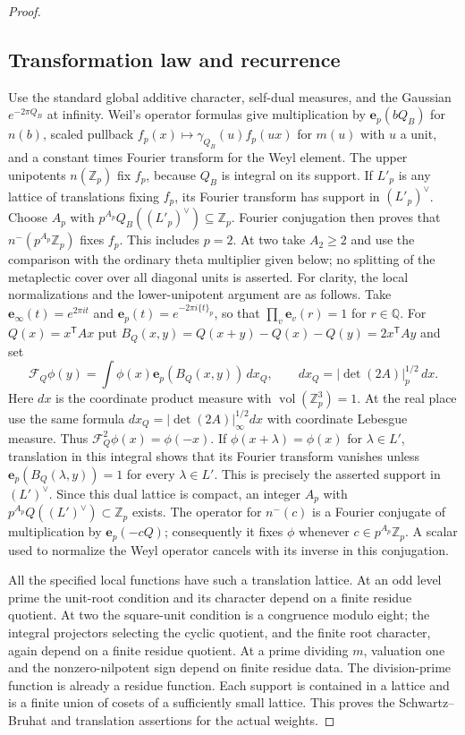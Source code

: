 \documentclass[11pt]{article}
\theoremstyle{definition}
\theoremstyle{remark}
\begin{document}
\begin{proof}
\subsection{Transformation law and recurrence}
Use the standard global additive character, self-dual measures,
and the Gaussian $e^{-2\pi Q_B}$ at infinity.  Weil's operator
formulas \cite[I.13]{weil} give multiplication by $\mathbf e_p(bQ_B)$ for
$n(b)$, scaled pullback $f_p(x)\mapsto\gamma_{Q_B}(u)f_p(ux)$ for
$m(u)$ with $u$ a unit, and a constant times Fourier transform
for the Weyl element.  The upper unipotents $n(\mathbb Z_p)$ fix
$f_p$, because $Q_B$ is integral on its support.  If $L'_p$ is any
lattice of translations fixing $f_p$, its Fourier transform has
support in $(L'_p)^\vee$.  Choose $A_p$ with
$p^{A_p}Q_B((L'_p)^\vee)\subseteq\mathbb Z_p$.  Fourier conjugation
then proves that $n^-(p^{A_p}\mathbb Z_p)$ fixes $f_p$.
This includes $p=2$. At two take $A_2\ge2$ and use the comparison
with the ordinary theta multiplier given below; no splitting of
the metaplectic cover over all diagonal units is asserted.
For clarity, the local normalizations and the lower-unipotent
argument are as follows. Take
$\mathbf e_\infty(t)=e^{2\pi it}$ and
$\mathbf e_p(t)=e^{-2\pi i\{t\}_p}$, so that
$\prod_v\mathbf e_v(r)=1$ for $r\in\mathbb Q$.
For $Q(x)=x^{\mathsf T}Ax$ put
$B_Q(x,y)=Q(x+y)-Q(x)-Q(y)=2x^{\mathsf T}Ay$ and set
\[
 \mathcal F_Q\phi(y)=\int\phi(x)\mathbf e_p(B_Q(x,y))\,dx_Q,
 \qquad dx_Q=|\det(2A)|_p^{1/2}\,dx.
\]
Here $dx$ is the coordinate product measure with
$\operatorname{vol}(\mathbb Z_p^3)=1$.
At the real place use the same formula
$dx_Q=|\det(2A)|_\infty^{1/2}dx$ with coordinate Lebesgue measure.
Thus $\mathcal F_Q^2\phi(x)=\phi(-x)$.
If $\phi(x+\lambda)=\phi(x)$ for $\lambda\in L'$, translation
in this integral shows that its Fourier transform vanishes unless
$\mathbf e_p(B_Q(\lambda,y))=1$ for every $\lambda\in L'$.
This is precisely the asserted support in $(L')^\vee$.
Since this dual lattice is compact, an integer $A_p$ with
$p^{A_p}Q((L')^\vee)\subset\mathbb Z_p$ exists. The operator
for $n^-(c)$ is a Fourier conjugate of multiplication by
$\mathbf e_p(-cQ)$; consequently it fixes $\phi$ whenever
$c\in p^{A_p}\mathbb Z_p$. A scalar used to normalize the Weyl
operator cancels with its inverse in this conjugation.

All the specified local functions have such a translation lattice.
At an odd level prime the unit-root condition and its character
depend on a finite residue quotient. At two the square-unit
condition is a congruence modulo eight; the integral projectors
selecting the cyclic quotient, and the finite root character,
again depend on a finite residue quotient. At a prime dividing
$m$, valuation one and the nonzero-nilpotent sign depend on finite
residue data. The division-prime function is already a residue
function. Each support is contained in a lattice and is a finite
union of cosets of a sufficiently small lattice. This proves the
Schwartz--Bruhat and translation assertions for the actual weights.


\end{proof}
\end{document}
